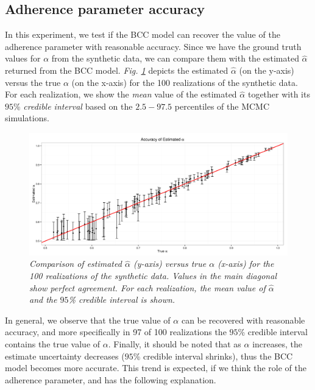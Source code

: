 \subsection{Adherence parameter accuracy } \label{integr-synth-alpha-sect}
In this experiment, we test if the BCC model can recover the value of the adherence parameter with reasonable accuracy. Since we have the ground truth values for $\alpha$ from the synthetic data, we can compare them with the estimated $\hat{\alpha}$ returned from the BCC model. \emph{Fig. \ref{adherence-test-pic}} depicts the estimated $\hat{\alpha}$ (on the y-axis) versus the true $\alpha$ (on the x-axis) for the 100 realizations of the synthetic data. For each realization, we show the \emph{mean} value of the estimated $\hat{\alpha}$ together with its $95$\% \emph{credible interval} based on the $2.5 - 97.5$ percentiles of the MCMC simulations. 
\begin{figure}[!ht]
\begin{center}
 \includegraphics[scale = 0.41]{images/adherenceTest.png}
\caption{\emph{Comparison of estimated $\hat{\alpha}$ (y-axis) versus true $\alpha$ (x-axis) for the 100 realizations of the synthetic data. Values in the main diagonal show perfect agreement. For each realization, the mean value of $\hat{\alpha}$ and the $95$\% credible interval is shown.}}
\label{adherence-test-pic}
\end{center}
\end{figure}

In general, we observe that the true value of $\alpha$ can be recovered with reasonable accuracy, and more specifically in 97 of 100 realizations the $95$\% credible interval contains the true value of $\alpha$. Finally, it should be noted that as $\alpha$ increases, the estimate uncertainty decreases (\ie $95$\% credible interval shrinks), thus the BCC model becomes more accurate. This trend is expected, if we think the role of the adherence parameter, and has the following explanation. 

